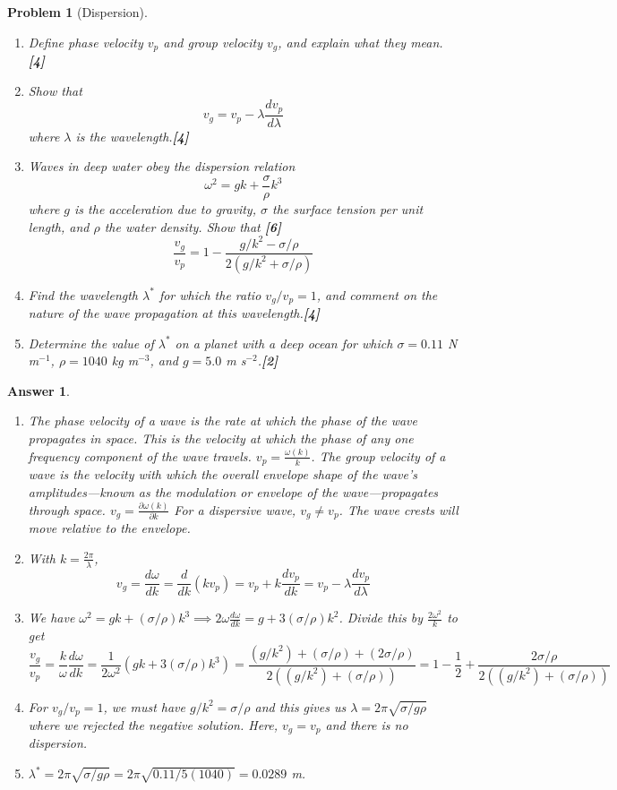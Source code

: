 \documentclass[a4paper]{article}
\newtheorem{ans}{Answer}[subsection]
\theoremstyle{new}
\newtheorem{qns}{Problem}[subsection]
\begin{document}
\newpage
\begin{qns}[Dispersion]\leavevmode
\begin{enumerate}[label=(\roman*)]
\item Define phase velocity $v_p$ and group velocity $v_g$, and explain what they mean.\hfill\textbf{[4]}
\item Show that
$$v_g=v_p-\lambda\frac{dv_p}{d\lambda}$$
where $\lambda$ is the wavelength.\hfill\textbf{[4]}
\item Waves in deep water obey the dispersion relation
$$\omega^2=gk+\frac{\sigma}{\rho}k^3$$
where $g$ is the acceleration due to gravity, $\sigma$ the surface tension per unit length, and $\rho$ the water density. Show that \hfill\textbf{[6]}
$$\frac{v_g}{v_p}=1-\frac{g/k^2-\sigma/\rho}{2(g/k^2+\sigma/\rho)}$$
\item Find the wavelength $\lambda^*$ for which the ratio $v_g/v_p=1$, and comment on the nature of the wave propagation at this wavelength.\hfill\textbf{[4]}
\item Determine the value of $\lambda^*$ on a planet with a deep ocean for which $\sigma=0.11$ N m$^{-1}$, $\rho=1040$ kg m$^{-3}$, and $g = 5.0$ m s$^{-2}$.\hfill\textbf{[2]}
\end{enumerate}
\end{qns}
\begin{ans}\leavevmode
\begin{enumerate}[label=(\roman*)]
\item The phase velocity of a wave is the rate at which the phase of the wave propagates in space. This is the velocity at which the phase of any one frequency component of the wave travels. $v_p=\frac{\omega(k)}{k}$. The group velocity of a wave is the velocity with which the overall envelope shape of the wave's amplitudes—known as the modulation or envelope of the wave—propagates through space. $v_g=\frac{\partial\omega(k)}{\partial k}$ For a dispersive wave, $v_g\neq v_p$. The wave crests will move relative to the envelope.
\item With $k=\frac{2\pi}{\lambda}$,
$$v_g=\frac{d\omega}{d k}=\frac{d}{dk}(kv_p)=v_p+k\frac{dv_p}{dk}=v_p-\lambda\frac{dv_p}{d\lambda}$$
\item We have $\omega^2=gk+(\sigma/\rho)k^3\implies 2\omega\frac{d\omega}{dk}=g+3(\sigma/\rho)k^2$. Divide this by $\frac{2\omega^2}{k}$ to get
$$\frac{v_g}{v_p}=\frac{k}{\omega}\frac{d\omega}{dk}=\frac{1}{2\omega^2}(gk+3(\sigma/\rho)k^3)=\frac{(g/k^2)+(\sigma/\rho)+(2\sigma/\rho)}{2((g/k^2)+(\sigma/\rho))}=1-\frac{1}{2}+\frac{2\sigma/\rho}{2((g/k^2)+(\sigma/\rho))}$$
\item For $v_g/v_p=1$, we must have $g/k^2=\sigma/\rho$ and this gives us $\lambda=2\pi\sqrt{\sigma/g\rho}$ where we rejected the negative solution. Here, $v_g=v_p$ and there is no dispersion.
\item $\lambda^*=2\pi\sqrt{\sigma/g\rho}=2\pi\sqrt{0.11/5(1040)}=0.0289$ m.
\end{enumerate}
\end{ans}
\end{document}
